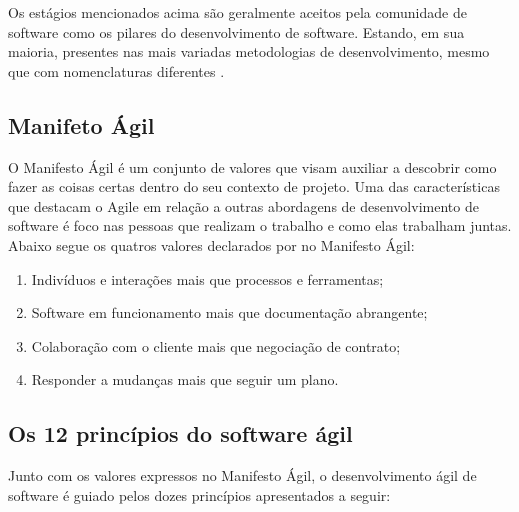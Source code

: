 Os estágios mencionados acima são geralmente aceitos pela comunidade de software
como os pilares do desenvolvimento de software. Estando, em sua maioria, presentes
nas mais variadas metodologias de desenvolvimento, mesmo que com nomenclaturas
diferentes \cite{Despa2014}.

\subsection{Manifeto Ágil}

O Manifesto Ágil é um conjunto de valores que visam auxiliar a descobrir como
fazer as coisas certas dentro do seu contexto de projeto. Uma das características
que destacam o Agile em relação a outras abordagens de desenvolvimento de software
é foco nas pessoas que realizam o trabalho e como elas trabalham juntas. Abaixo
segue os quatros valores declarados por  no Manifesto Ágil:

\begin{enumerate}
    \item Indivíduos e interações mais que processos e ferramentas;
    \item Software em funcionamento mais que documentação abrangente;
    \item Colaboração com o cliente mais que negociação de contrato;
    \item Responder a mudanças mais que seguir um plano.
\end{enumerate}

\subsection{Os 12 princípios do software ágil}

Junto com os valores expressos no Manifesto Ágil, o desenvolvimento ágil de software
é guiado pelos dozes princípios apresentados a seguir:

